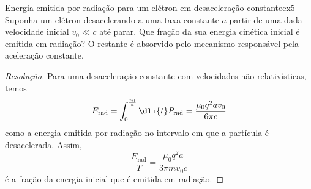 \begin{exercício}{Energia emitida por radiação para um elétron em desaceleração constante}{ex5}
    Suponha um elétron desacelerando a uma taxa constante \(a\) partir de uma dada velocidade inicial \(v_0 \ll c\) até parar. Que fração da sua energia cinética inicial é emitida em radiação? O restante é absorvido pelo mecanismo responsável pela aceleração constante.
\end{exercício}
\begin{proof}[Resolução]
    Para uma desaceleração constante com velocidades não relativísticas, temos 
    \begin{equation*}
        E_{\mathrm{rad}} = \int_0^{\frac{v_0}{a}} \dli{t} P_{\mathrm{rad}} = \frac{\mu_0 q^2 a v_0}{6\pi c}
    \end{equation*}
    como a energia emitida por radiação no intervalo em que a partícula é desacelerada. Assim,
    \begin{equation*}
        \frac{E_\mathrm{rad}}{T} = \frac{\mu_0 q^2 a}{3\pi m v_0 c}
    \end{equation*}
    é a fração da energia inicial que é emitida em radiação.
\end{proof}
